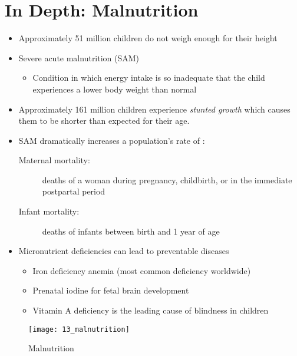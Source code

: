 \documentclass[title={Chapter 13}]{fdsn201notes}
\begin{document}
\section{In Depth: Malnutrition}\label{sec:in-depth:-malnutrition}
\begin{itemize}
	\item Approximately 51 million children do not weigh enough for their height
	\item Severe acute malnutrition (SAM)\label{dfn:sam}
	\begin{itemize}
		\item Condition in which energy intake is so inadequate that the child experiences a lower body weight than normal
	\end{itemize}
	\item Approximately 161 million children experience \emph{stunted growth} which causes them to be shorter than expected for their age.
	\item SAM dramatically increases a population’s rate of :
	\begin{description}
		\item[Maternal mortality:] deaths of a woman during pregnancy, childbirth, or in the immediate postpartal period
		\item[Infant mortality:] deaths of infants between birth and 1 year of age
	\end{description}
	\item Micronutrient deficiencies can lead to preventable diseases
	\begin{itemize}
		\item Iron deficiency anemia (most common deficiency worldwide)
		\item Prenatal iodine for fetal brain development
		\item Vitamin A deficiency is the leading cause of blindness in children
	\end{itemize}
\end{itemize}

\begin{figure}[H]
	\centering
	\texttt{[image: 13\_malnutrition]}
	\caption{Malnutrition}
	\label{fig:malnutrition}
\end{figure}
\end{document}
